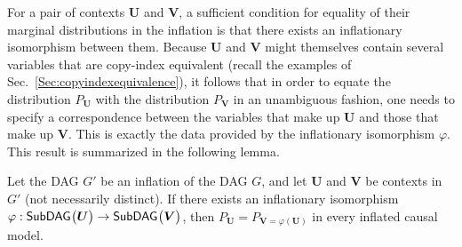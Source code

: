 {%


For a pair of contexts $\bm{U}$ and $\bm{V}$, a sufficient condition for equality of their marginal distributions in the inflation is that there exists an inflationary isomorphism between them.  Because $\bm{U}$ and $\bm{V}$ might themselves contain several variables that are copy-index equivalent (recall the examples of Sec.~\ref{Sec:copyindexequivalence}), it follows that in order to equate the distribution $P_{\bm{U}}$ with the distribution $P_{\bm{V}}$ in an unambiguous fashion, one needs to specify a correspondence between the variables that make up $\bm{U}$ and those that make up $\bm{V}$. This is exactly the data provided by the inflationary isomorphism $\varphi$.  This result is summarized in the following lemma.



\begin{lemma}
Let the DAG $G'$ be an inflation of the DAG $G$, and let $\bm{U}$ and $\bm{V}$ be contexts in $G'$ (not necessarily distinct). If there exists an inflationary isomorphism $\varphi:{\operatorname{\mathsf{SubDAG}}_{}}\bigl\lparen\bm{U}\bigr\rparen\to{\operatorname{\mathsf{SubDAG}}_{}}\bigl\lparen\bm{V}\bigr\rparen$, then $P_{\bm{U}} = P_{\bm{V}=\varphi (\bm{U})}$ in every inflated causal model.
	\label{lem:coincide}
\end{lemma}

}
